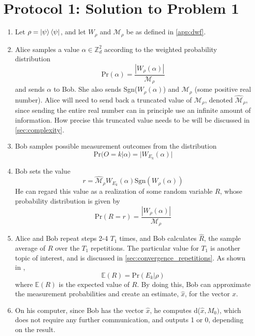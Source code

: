 \documentclass[../3Wworkreport.tex]{subfiles}
\begin{document}
\section{Protocol 1: Solution to Problem 1}
\label{sec:protocol1}
\begin{enumerate}
	\item
		Let $\rho = \ket{\psi}\bra{\psi}$, and let $W_\rho$ and $\mathcal{M}_\rho$ be as defined in \autoref{app:dwf}.
	\item
		Alice samples a value $\alpha \in \mathbb{Z}_d^2$ according to the weighted probability distribution 
		\begin{equation}
			\text{Pr}(\alpha) = \frac{|W_\rho(\alpha)|}{\mathcal{M}_\rho}
		\end{equation}
		and sends $\alpha$ to Bob. She also sends Sgn($W_\rho(\alpha)$) and $\mathcal{M}_\rho$ (some positive real number). Alice will need to send back a truncated value of $\mathcal{M}_\rho$, denoted $\hat{\mathcal{M}}_\rho$, since sending the entire real number can in principle use an infinite amount of information. How precise this truncated value needs to be will be discussed in \autoref{sec:complexity}.

	\item
		Bob samples possible measurement outcomes from the distribution
		\begin{equation}
			\text{Pr}(O = k | \alpha) = |W_{E_k}(\alpha)|
		\end{equation}

	\item
		Bob sets the value
		\begin{equation}
			r = \hat{\mathcal{M}}_\rho W_{E_k}(\alpha) \text{Sgn}(W_\rho(\alpha))
		\end{equation}
		He can regard this value as a realization of some random variable $R$, whose probability distribution is given by
		\begin{equation}
			\text{Pr}(R = r) = \frac{|W_\rho(\alpha)|}{\mathcal{M}_\rho}
		\end{equation}

	\item
		Alice and Bob repeat steps 2-4 $T_1$ times, and Bob calculates $\hat{R}$, the sample average of $R$ over the $T_1$ repetitions. The particular value for $T_1$ is another topic of interest, and is discussed in \autoref{sec:convergence_repetitions}. As shown in \cite{Pashayan2014},
		\begin{equation}
			\mathbb{E}(R) = \text{Pr}(E_k| \rho)
		\end{equation}
		where $\mathbb{E}(R)$ is the expected value of $R$. By doing this, Bob can approximate the measurement probabilities and create an estimate, $\hat{x}$, for the vector $x$.

	\item
		On his computer, since Bob has the vector $\hat{x}$, he computes d($\hat{x}, M_0)$, which does not require any further communication, and outputs 1 or 0, depending on the result.
\end{enumerate}
\end{document}
